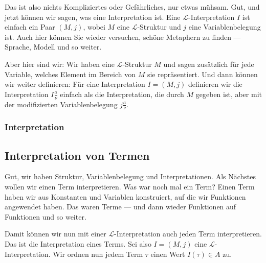 \begin{spoken-clean}[00:53:05 - 00:55:40]
Das ist also nichts Kompliziertes oder Gefährliches, nur etwas mühsam. Gut, und jetzt können wir sagen, was eine Interpretation ist. Eine $\mathcal{L}$-Interpretation $I$ ist einfach ein Paar $(M, j)$, wobei $M$ eine $\mathcal{L}$-Struktur und $j$ eine Variablenbelegung ist. Auch hier können Sie wieder versuchen, schöne Metaphern zu finden --- Sprache, Modell und so weiter.

Aber hier sind wir: Wir haben eine $\mathcal{L}$-Struktur $M$ und sagen zusätzlich für jede Variable, welches Element im Bereich von $M$ sie repräsentiert. Und dann können wir weiter definieren: Für eine Interpretation $I = (M, j)$ definieren wir die Interpretation $I \frac{a}{\nu}$ einfach als die Interpretation, die durch $M$ gegeben ist, aber mit der modifizierten Variablenbelegung $j \frac{a}{\nu}$.
\end{spoken-clean}

\subsubsection{Interpretation}
\begin{math-stroke}

\end{math-stroke}

\subsection{Interpretation von Termen}

\begin{spoken-clean}[00:55:40 - 00:58:20]
Gut, wir haben Struktur, Variablenbelegung und Interpretationen. Als Nächstes wollen wir einen Term interpretieren. Was war noch mal ein Term? Einen Term haben wir aus Konstanten und Variablen konstruiert, auf die wir Funktionen angewendet haben. Das waren Terme --- und dann wieder Funktionen auf Funktionen und so weiter.

Damit können wir nun mit einer $\mathcal{L}$-Interpretation auch jeden Term interpretieren. Das ist die Interpretation eines Terms. Sei also $I = (M, j)$ eine $\mathcal{L}$-Interpretation. Wir ordnen nun jedem Term $\tau$ einen Wert $I(\tau) \in A$ zu.
\end{spoken-clean}

